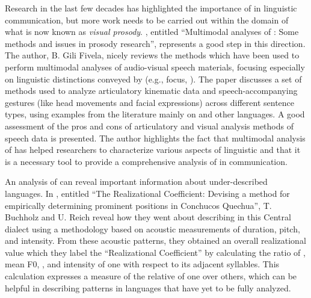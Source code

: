 \documentclass[output=paper]{langsci/langscibook}
\begin{document}
Research in the last few decades has highlighted the importance of  in linguistic communication, but more work needs to be carried out within the domain of what is now known as \textit{visual prosody}. \textbf{}, entitled ``Multimodal analyses of : Some methods and issues in prosody research”, represents a good step in this direction. The author, B. Gili Fivela, nicely reviews the methods which have been used to perform multimodal analyses of audio-visual speech materials, focusing especially on linguistic distinctions conveyed by  (e.g.,  focus, ). The paper discusses a set of methods used to analyze articulatory kinematic data and speech-accompanying gestures (like head movements and facial expressions) across different sentence types, using examples from the literature mainly on  and other  languages. A good assessment of the pros and cons of articulatory and visual analysis methods of speech data is presented. The author highlights the fact that multimodal analysis of  has helped researchers to characterize various aspects of linguistic  and that it is a necessary tool to provide a comprehensive analysis of  in communication. 

An analysis of  can reveal important information about under-described languages. In \textbf{}, entitled ``The Realizational Coefficient: Devising a method for empirically determining prominent positions in Conchucos Quechua”, T. Buchholz and U. Reich reveal how they went about describing  in this Central  dialect using a methodology based on acoustic measurements of duration, pitch, and intensity. From these acoustic patterns, they obtained an overall realizational value which they label the ``Realizational Coefficient” by calculating the ratio of , mean F0, , and intensity of one  with respect to its adjacent syllables. This calculation expresses a measure of the relative  of one  over others, which can be helpful in describing  patterns in languages that have yet to be fully analyzed.
\end{document}
